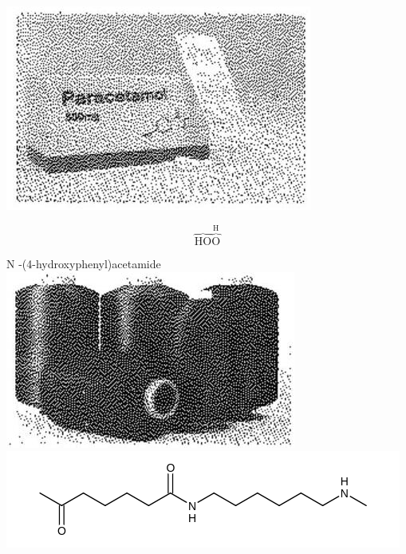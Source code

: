 \documentclass[10pt]{article}
\begin{document}
\begin{center}
\includegraphics[max width=\textwidth]{2025_10_23_74efce88ce3a451fd6b0g-026}
\end{center}

$$
\overbrace{\mathrm{HO}} \overbrace{\mathrm{O}}^{\mathrm{H}}
$$

N -(4-hydroxyphenyl)acetamide\\
\includegraphics[max width=\textwidth, center]{2025_10_23_74efce88ce3a451fd6b0g-026(1)}\\
\includegraphics{smile-4905d81af2e8cc19d521fb8d7fb863597df45a06}
\end{document}
